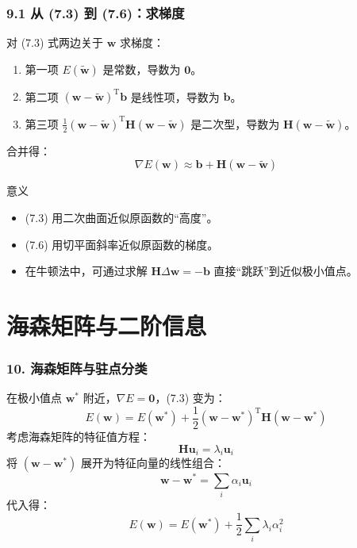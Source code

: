 \documentclass[t,aspectratio=169]{beamer} %
\begin{document}
\begin{frame}
    \frametitle{9.1 从 (7.3) 到 (7.6)：求梯度}
    对 (7.3) 式两边关于 $\mathbf{w}$ 求梯度：
    \begin{enumerate}
        \item 第一项 $E(\tilde{\mathbf{w}})$ 是常数，导数为 $\mathbf{0}$。
        \item 第二项 $(\mathbf{w} - \tilde{\mathbf{w}})^\mathrm{T} \mathbf{b}$ 是线性项，导数为 $\mathbf{b}$。
        \item 第三项 $\frac{1}{2} (\mathbf{w} - \tilde{\mathbf{w}})^\mathrm{T} \mathbf{H} (\mathbf{w} - \tilde{\mathbf{w}})$ 是二次型，导数为 $\mathbf{H}(\mathbf{w} - \tilde{\mathbf{w}})$。
    \end{enumerate}
    合并得：
    \[
    \nabla E(\mathbf{w}) \approx \mathbf{b} + \mathbf{H}(\mathbf{w} - \tilde{\mathbf{w}})
    \]
    \begin{block}{意义}
        \begin{itemize}
            \item (7.3) 用二次曲面近似原函数的“高度”。
            \item (7.6) 用切平面斜率近似原函数的梯度。
            \item 在牛顿法中，可通过求解 $\mathbf{H}\Delta\mathbf{w} = -\mathbf{b}$ 直接“跳跃”到近似极小值点。
        \end{itemize}
    \end{block}
\end{frame}

\section{海森矩阵与二阶信息}

\begin{frame}
    \frametitle{10. 海森矩阵与驻点分类}
    在极小值点 $\mathbf{w}^*$ 附近，$\nabla E = \mathbf{0}$，(7.3) 变为：
    \begin{equation}
    E(\mathbf{w}) = E(\mathbf{w}^*) + \frac{1}{2} (\mathbf{w} - \mathbf{w}^*)^\mathrm{T} \mathbf{H} (\mathbf{w} - \mathbf{w}^*)
    \tag{7.7}
    \end{equation}
    考虑海森矩阵的特征值方程：
    \begin{equation}
    \mathbf{H} \mathbf{u}_i = \lambda_i \mathbf{u}_i
    \tag{7.8}
    \end{equation}
    将 $(\mathbf{w} - \mathbf{w}^*)$ 展开为特征向量的线性组合：
    \begin{equation}
    \mathbf{w} - \mathbf{w}^* = \sum_i \alpha_i \mathbf{u}_i
    \tag{7.10}
    \end{equation}
    代入得：
    \begin{equation}
    E(\mathbf{w}) = E(\mathbf{w}^*) + \frac{1}{2} \sum_i \lambda_i \alpha_i^2
    \tag{7.11}
    \end{equation}
\end{frame}
\end{document}
